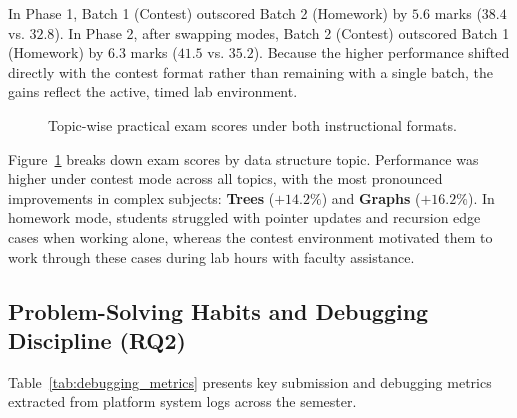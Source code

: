 \documentclass[12pt,a4paper]{article}
\begin{document}
In Phase 1, Batch 1 (Contest) outscored Batch 2 (Homework) by $5.6$ marks ($38.4$ vs. $32.8$). In Phase 2, after swapping modes, Batch 2 (Contest) outscored Batch 1 (Homework) by $6.3$ marks ($41.5$ vs. $35.2$). Because the higher performance shifted directly with the contest format rather than remaining with a single batch, the gains reflect the active, timed lab environment.

\begin{figure}[!htbp]
\centering
{}
\caption{Topic-wise practical exam scores under both instructional formats.}
\label{fig:topic_scores}
\end{figure}

Figure~\ref{fig:topic_scores} breaks down exam scores by data structure topic. Performance was higher under contest mode across all topics, with the most pronounced improvements in complex subjects: \textbf{Trees} ($+14.2\%$) and \textbf{Graphs} ($+16.2\%$). In homework mode, students struggled with pointer updates and recursion edge cases when working alone, whereas the contest environment motivated them to work through these cases during lab hours with faculty assistance.

\subsection{Problem-Solving Habits and Debugging Discipline (RQ2)}
Table~\ref{tab:debugging_metrics} presents key submission and debugging metrics extracted from platform system logs across the semester.
\end{document}
